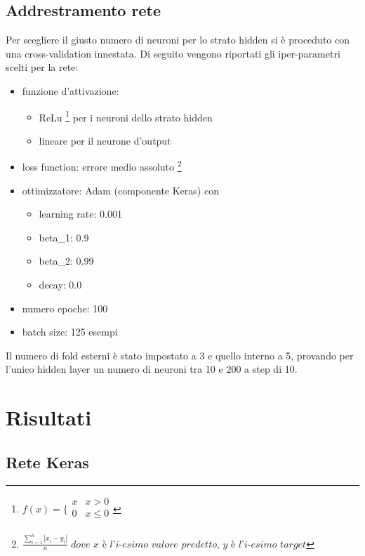 \documentclass[12pt]{report}
\begin{document}
\subsection{Addrestramento rete}
Per scegliere il giusto numero di neuroni per lo strato hidden si è proceduto con una cross-validation innestata. Di seguito vengono riportati gli iper-parametri scelti per la rete:
\begin{itemize}
\item{funzione d’attivazione}:

\begin{itemize}
\item{ReLu 
\footnote{$f(x) =
\bigg \{
\begin{array}{rl}
x & x > 0 \\
0 & x \leq 0 \\
\end{array}
$
} per i neuroni dello strato hidden}
\item{lineare per il neurone d'output}
\end{itemize}

\item{loss function}: errore medio assoluto \footnote{
$\displaystyle{\frac{\sum_{i=1}^n \left|x_i - y_i\right|}{n}} \; \textit{dove x è l'i-esimo valore predetto, y è l'i-esimo target}$
}

\item{ottimizzatore}: Adam (componente Keras) con

\begin{itemize}
\item{learning rate}: 0.001
\item{beta\_1}: 0.9
\item{beta\_2}: 0.99
\item{decay}: 0.0
\end{itemize}

\item{numero epoche}: 100

\item{batch size}: 125 esempi
\end{itemize}

Il numero di fold esterni è stato impostato a 3 e quello interno a 5, provando per l'unico hidden layer un numero di neuroni tra 10 e 200 a step di 10.

\section{Risultati}

\subsection{Rete Keras}
\end{document}

